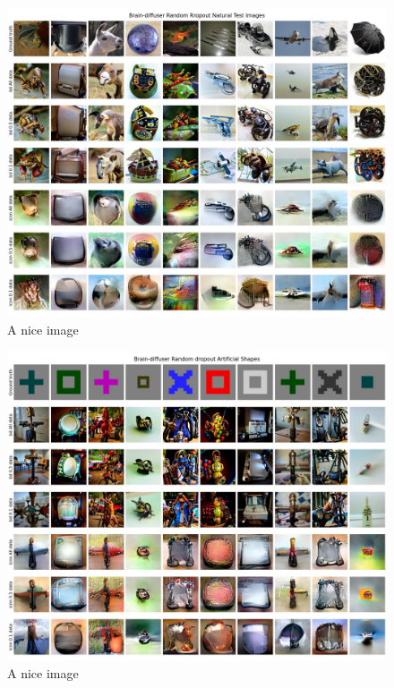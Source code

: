 
\begin{figure}[ht]
    \centering
    \includegraphics[width=1\textwidth]{plots/dropout_qual_random_test.JPEG}
    \caption{A nice image}\label{fig:dropout_qual_random_test}
\end{figure}

\begin{figure}[ht]
    \centering
    \includegraphics[width=1\textwidth]{plots/dropout_qual_random_art.JPEG}
    \caption{A nice image}\label{fig:dropout_qual_random_art}
\end{figure}

